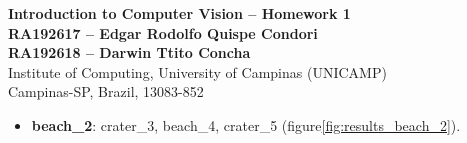 \documentclass[10pt, a4paper]{article}
\begin{document}
\begin{center}

\textbf{Introduction to Computer Vision -- Homework 1} \\[0.1cm]

\textbf{RA192617 -- Edgar Rodolfo Quispe Condori} \\[0.1cm]
\textbf{RA192618 -- Darwin Ttito Concha} \\[0.1cm]

Institute of Computing, University of Campinas (UNICAMP) \\
Campinas-SP, Brazil, 13083-852 \\
\end{center}


\begin{itemize}
\item \textbf{beach\_2}: crater\_3, beach\_4, crater\_5 (figure\ref{fig:results_beach_2}).


\end{itemize}
\end{document}
